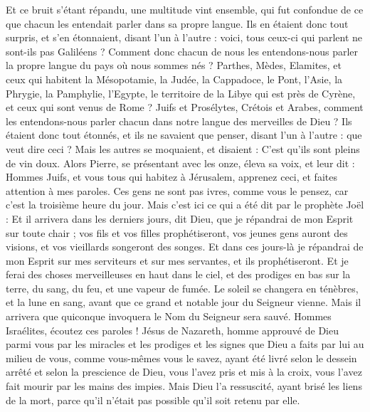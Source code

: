 \begin{multicols}{2}
Et ce bruit s'étant répandu, une multitude vint ensemble, qui fut confondue de ce que chacun les entendait parler dans sa propre langue. 
Ils en étaient donc tout surpris, et s'en étonnaient, disant l'un à l'autre : voici, tous ceux-ci qui parlent ne sont-ils pas Galiléens ?
Comment donc chacun de nous les entendons-nous parler la propre langue du pays où nous sommes nés ? 
Parthes, Mèdes, Elamites, et ceux qui habitent la Mésopotamie, la Judée, la Cappadoce, le Pont, l'Asie,
la Phrygie, la Pamphylie, l'Egypte, le territoire de la Libye qui est près de Cyrène, et ceux qui sont venus de Rome ?
Juifs et Prosélytes, Crétois et Arabes, comment les entendons-nous parler chacun dans notre langue des merveilles de Dieu ?
Ils étaient donc tout étonnés, et ils ne savaient que penser, disant l'un à l'autre : que veut dire ceci ?
Mais les autres se moquaient, et disaient : C'est qu'ils sont pleins de vin doux.
Alors Pierre, se présentant avec les onze, éleva sa voix, et leur dit : Hommes Juifs, et vous tous qui habitez à Jérusalem, apprenez ceci, et faites attention à mes paroles.
Ces gens ne sont pas ivres, comme vous le pensez, car c'est la troisième heure du jour.
Mais c'est ici ce qui a été dit par le prophète Joël :
Et il arrivera dans les derniers jours, dit Dieu, que je répandrai de mon Esprit sur toute chair ; vos fils et vos filles prophétiseront, vos jeunes gens auront des visions, et vos vieillards songeront des songes.
Et dans ces jours-là je répandrai de mon Esprit sur mes serviteurs et sur mes servantes, et ils prophétiseront.
Et je ferai des choses merveilleuses en haut dans le ciel, et des prodiges en bas sur la terre, du sang, du feu, et une vapeur de fumée.
Le soleil se changera en ténèbres, et la lune en sang, avant que ce grand et notable jour du Seigneur vienne.
Mais il arrivera que quiconque invoquera le Nom du Seigneur sera sauvé.
Hommes Israélites, écoutez ces paroles ! Jésus de Nazareth, homme approuvé de Dieu parmi vous par les miracles et les prodiges et les signes que Dieu a faits par lui au milieu de vous, comme vous-mêmes vous le savez,
ayant été livré selon le dessein arrêté et selon la prescience de Dieu, vous l'avez pris et mis à la croix, vous l'avez fait mourir par les mains des impies.
Mais Dieu l'a ressuscité, ayant brisé les liens de la mort, parce qu'il n'était pas possible qu'il soit retenu par elle.

\end{multicols}
